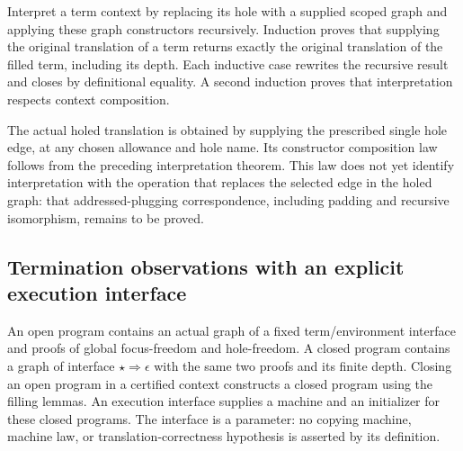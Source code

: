 Interpret a term context by replacing its hole with a supplied scoped graph
and applying these graph constructors recursively. Induction proves that
supplying the original translation of a term returns exactly the original
translation of the filled term, including its depth. Each inductive case
rewrites the recursive result and closes by definitional equality. A second
induction proves that interpretation respects context composition.

The actual holed translation is obtained by supplying the prescribed
single hole edge, at any chosen allowance and hole name. Its constructor
composition law follows from the preceding interpretation theorem. This
law does not yet identify interpretation with the operation that replaces
the selected edge in the holed graph: that addressed-plugging correspondence,
including padding and recursive isomorphism, remains to be proved.

























\subsection{Termination observations with an explicit execution interface}


An open program contains an actual graph of a fixed term/environment
interface and proofs of global focus-freedom and hole-freedom. A closed
program contains a graph of interface $\star\Rightarrow\epsilon$ with
the same two proofs and its finite depth. Closing an open program in a
certified context constructs a closed program using the filling lemmas.
An execution interface supplies a machine and an initializer for these
closed programs. The interface is a parameter: no copying machine, machine
law, or translation-correctness hypothesis is asserted by its definition.

